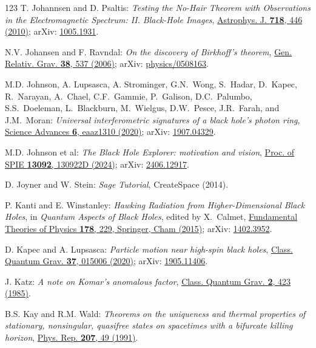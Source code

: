 \begin{thebibliography}{123}
T. Johannsen and D. Psaltis:
{\em Testing the No-Hair Theorem with Observations in the Electromagnetic Spectrum: II. Black-Hole Images},
\href{https://doi.org/10.1088/0004-637X/718/1/446}{Astrophys. J. {\bf 718}, 446 (2010)};
arXiv: \href{https://arxiv.org/abs/1005.1931}{1005.1931}.

N.V. Johansen and F. Ravndal:
{\em On the discovery of Birkhoff's theorem},
\href{https://doi.org/10.1007/s10714-006-0242-0}{Gen. Relativ. Grav. {\bf 38}, 537 (2006)};
arXiv: \href{https://arxiv.org/abs/physics/0508163}{physics/0508163}.

M.D. Johnson, A. Lupsasca, A. Strominger, G.N.~Wong, S.~Hadar, D.~Kapec, R.~Narayan, A.~Chael,
C.F.~Gammie, P.~Galison, D.C.~Palumbo, S.S.~Doeleman, L.~Blackburn, M.~Wielgus, D.W.~Pesce,
J.R.~Farah, and J.M.~Moran:
{\em Universal interferometric signatures of a black hole's photon ring},
\href{https://doi.org/10.1126/sciadv.aaz1310}{Science Advances {\bf 6}, eaaz1310 (2020)};
arXiv: \href{https://arxiv.org/abs/1907.04329}{1907.04329}.

M.D. Johnson et al:
{\em The Black Hole Explorer: motivation and vision},
\href{https://doi.org/10.1117/12.3019835}{Proc. of SPIE {\bf 13092}, 130922D (2024)};
arXiv: \href{https://arxiv.org/abs/2406.12917}{2406.12917}.

D. Joyner and W. Stein: {\em Sage Tutorial}, CreateSpace (2014).

P. Kanti and E. Winstanley: {\em Hawking Radiation from Higher-Dimensional Black Holes},
in {\em Quantum Aspects of Black Holes}, edited by X.~Calmet,
\href{https://doi.org/10.1007/978-3-319-10852-0_8}{Fundamental Theories of Physics {\bf 178}, 229, Springer, Cham (2015)};
arXiv: \href{https://arxiv.org/abs/1402.3952}{1402.3952}.

D. Kapec and A. Lupsasca:
{\em Particle motion near high-spin black holes},
\href{https://doi.org/10.1088/1361-6382/ab519e}{Class. Quantum Grav. {\bf 37}, 015006 (2020)};
arXiv: \href{https://arxiv.org/abs/1905.11406}{1905.11406}.

J. Katz:
{\em A note on Komar's anomalous factor},
\href{https://doi.org/10.1088/0264-9381/2/3/018}{Class. Quantum Grav. {\bf 2}, 423 (1985)}.

B.S. Kay and R.M. Wald:
{\em Theorems on the uniqueness and thermal properties of stationary, nonsingular, quasifree states on spacetimes with a bifurcate killing horizon},
\href{https://doi.org/10.1016/0370-1573(91)90015-E}{Phys. Rep. {\bf 207}, 49 (1991)}.


\end{thebibliography}
